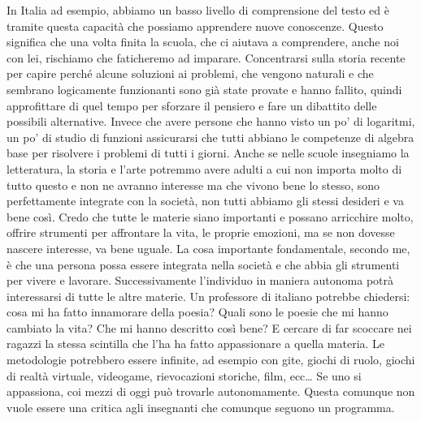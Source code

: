 \documentclass[12pt]{book} %
\begin{document}
In Italia ad esempio, abbiamo un basso livello di comprensione del testo ed è tramite questa capacità che possiamo
apprendere nuove conoscenze. Questo significa che una volta finita la scuola, che ci aiutava a comprendere, anche noi con lei,
rischiamo che faticheremo ad imparare. 
Concentrarsi sulla storia recente per capire perché alcune soluzioni ai
problemi, che vengono naturali e che sembrano logicamente funzionanti sono già state provate e hanno fallito, quindi
approfittare di quel tempo per sforzare il pensiero e fare un dibattito delle possibili alternative. Invece che avere
persone che hanno visto un po' di logaritmi, un po' di studio di funzioni assicurarsi che tutti
abbiano le competenze di algebra base per risolvere i problemi di tutti i giorni. 
Anche se nelle scuole
insegniamo la letteratura, la storia e l'arte potremmo avere adulti a cui non importa molto di tutto
questo e non ne avranno interesse ma che vivono bene lo stesso, sono perfettamente integrate con la società, non
tutti abbiamo gli stessi desideri e va bene così. 
Credo che tutte le materie siano importanti e possano arricchire molto, offrire
strumenti per affrontare la vita, le proprie emozioni, ma se non dovesse nascere interesse, va bene uguale. 
La cosa importante fondamentale, secondo me, è che una persona possa essere integrata nella società e che abbia gli strumenti per vivere e
lavorare. Successivamente l'individuo in maniera autonoma potrà interessarsi di tutte le altre
materie.
Un professore di italiano potrebbe chiedersi: cosa mi ha fatto innamorare della poesia? Quali sono le poesie che mi hanno cambiato la vita? 
Che mi hanno descritto così bene? E cercare di far scoccare nei
ragazzi la stessa scintilla che l'ha ha fatto appassionare a quella materia. 
Le metodologie potrebbero essere infinite, ad esempio con gite, giochi di ruolo, giochi di realtà virtuale,
videogame, rievocazioni storiche, film, ecc… Se uno si appassiona, coi mezzi di oggi può
trovarle autonomamente. Questa comunque non vuole essere una critica agli insegnanti che comunque seguono un programma.
\end{document}
